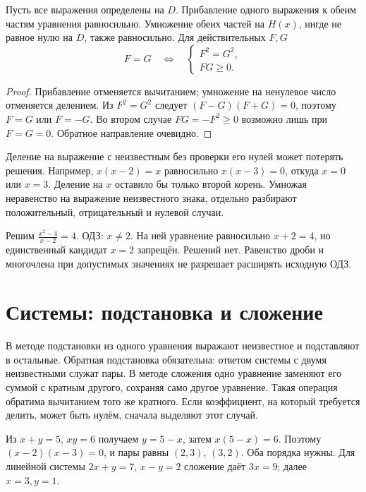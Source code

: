 \ifdim\dimexpr\ht\CatFlowBox+\dp\CatFlowBox\relax<58mm\dp\CatFlowBox=\dimexpr58mm-\ht\CatFlowBox\relax\fi%
\noindent\usebox{\CatFlowBox}\par\addvspace{2pt}
\begin{theorem}
Пусть все выражения определены на \(D\). Прибавление одного выражения к обеим частям уравнения равносильно. Умножение обеих частей на \(H(x)\), нигде не равное нулю на \(D\), также равносильно. Для действительных \(F,G\)
\[
F=G\quad\Longleftrightarrow\quad
\begin{cases}F^2=G^2,\\FG\geq0.\end{cases}
\]
\end{theorem}
\begin{proof}Прибавление отменяется вычитанием; умножение на ненулевое число отменяется делением. Из \(F^2=G^2\) следует \((F-G)(F+G)=0\), поэтому \(F=G\) или \(F=-G\). Во втором случае \(FG=-F^2\geq0\) возможно лишь при \(F=G=0\). Обратное направление очевидно.\end{proof}
Деление на выражение с неизвестным без проверки его нулей может потерять решения. Например, \(x(x-2)=x\) равносильно \(x(x-3)=0\), откуда \(x=0\) или \(x=3\). Деление на \(x\) оставило бы только второй корень. Умножая неравенство на выражение неизвестного знака, отдельно разбирают положительный, отрицательный и нулевой случаи.
\begin{example}Решим \(\frac{x^2-4}{x-2}=4\). ОДЗ: \(x\ne2\). На ней уравнение равносильно \(x+2=4\), но единственный кандидат \(x=2\) запрещён. Решений нет. Равенство дроби и многочлена при допустимых значениях не разрешает расширять исходную ОДЗ.\end{example}

\section{Системы: подстановка и сложение}
В методе подстановки из одного уравнения выражают неизвестное и подставляют в остальные. Обратная подстановка обязательна: ответом системы с двумя неизвестными служат пары. В методе сложения одно уравнение заменяют его суммой с кратным другого, сохраняя само другое уравнение. Такая операция обратима вычитанием того же кратного. Если коэффициент, на который требуется делить, может быть нулём, сначала выделяют этот случай.
\begin{example}Из \(x+y=5\), \(xy=6\) получаем \(y=5-x\), затем \(x(5-x)=6\). Поэтому \((x-2)(x-3)=0\), и пары равны \((2,3)\), \((3,2)\). Оба порядка нужны. Для линейной системы \(2x+y=7\), \(x-y=2\) сложение даёт \(3x=9\); далее \(x=3,y=1\).\end{example}


